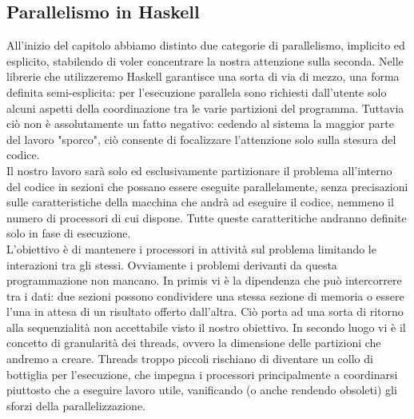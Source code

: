 \subsection{Parallelismo in Haskell}
All'inizio del capitolo abbiamo distinto due categorie di parallelismo, implicito ed esplicito, stabilendo di voler concentrare la nostra attenzione sulla seconda. Nelle librerie che utilizzeremo Haskell garantisce una sorta di via di mezzo, una forma definita semi-esplicita: per l'esecuzione parallela sono richiesti dall'utente solo alcuni aspetti della coordinazione tra le varie partizioni del programma. Tuttavia ciò non è assolutamente un fatto negativo: cedendo al sistema la maggior parte del lavoro "sporco", ciò consente di focalizzare l'attenzione solo sulla stesura del codice.\\
Il nostro lavoro sarà solo ed esclusivamente partizionare il problema all'interno del codice in sezioni che possano essere eseguite parallelamente, senza precisazioni sulle caratteristiche della macchina che andrà ad eseguire il codice, nemmeno il numero di processori di cui dispone. Tutte queste caratteritiche andranno definite solo in fase di esecuzione.\\
L'obiettivo è di mantenere i processori in attività sul problema limitando le interazioni tra gli stessi. Ovviamente i problemi derivanti da questa programmazione non mancano. In primis vi è la dipendenza che può intercorrere tra i dati: due sezioni possono condividere una stessa sezione di memoria o essere l'una in attesa di un risultato offerto dall'altra. Ciò porta ad una sorta di ritorno alla sequenzialità non accettabile visto il nostro obiettivo. In secondo luogo vi è il concetto di granularità dei threads, ovvero la dimensione delle partizioni che andremo a creare. Threads troppo piccoli rischiano di diventare un collo di bottiglia per l'esecuzione, che impegna i processori principalmente a coordinarsi piuttosto che a eseguire lavoro utile, vanificando (o anche rendendo obsoleti) gli sforzi della parallelizzazione.
